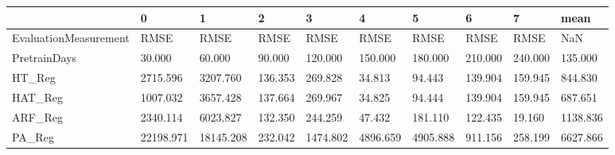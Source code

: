 \begin{tabular}{llllllllll}
\toprule
{} &         0 &         1 &       2 &        3 &        4 &        5 &       6 &       7 &     mean \\
\midrule
EvaluationMeasurement &      RMSE &      RMSE &    RMSE &     RMSE &     RMSE &     RMSE &    RMSE &    RMSE &      NaN \\
PretrainDays          &    30.000 &    60.000 &  90.000 &  120.000 &  150.000 &  180.000 & 210.000 & 240.000 &  135.000 \\
HT\_Reg                &  2715.596 &  3207.760 & 136.353 &  269.828 &   34.813 &   94.443 & 139.904 & 159.945 &  844.830 \\
HAT\_Reg               &  1007.032 &  3657.428 & 137.664 &  269.967 &   34.825 &   94.444 & 139.904 & 159.945 &  687.651 \\
ARF\_Reg               &  2340.114 &  6023.827 & 132.350 &  244.259 &   47.432 &  181.110 & 122.435 &  19.160 & 1138.836 \\
PA\_Reg                & 22198.971 & 18145.208 & 232.042 & 1474.802 & 4896.659 & 4905.888 & 911.156 & 258.199 & 6627.866 \\
\bottomrule
\end{tabular}
